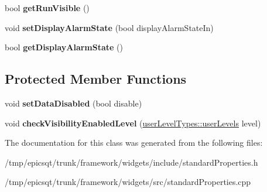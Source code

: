 \begin{DoxyCompactItemize}
\item 
\hypertarget{classstandardProperties_aad59ccae5e05b7807ff46f76323ee4a6}{
bool {\bfseries getRunVisible} ()}
\label{classstandardProperties_aad59ccae5e05b7807ff46f76323ee4a6}

\item 
\hypertarget{classstandardProperties_a3040c5de38de095b6bc3274f148bce8f}{
void {\bfseries setDisplayAlarmState} (bool displayAlarmStateIn)}
\label{classstandardProperties_a3040c5de38de095b6bc3274f148bce8f}

\item 
\hypertarget{classstandardProperties_a4ce4f7715acc47d741d9b2d7e7efb998}{
bool {\bfseries getDisplayAlarmState} ()}
\label{classstandardProperties_a4ce4f7715acc47d741d9b2d7e7efb998}

\end{DoxyCompactItemize}
\subsection*{Protected Member Functions}
\begin{DoxyCompactItemize}
\item 
\hypertarget{classstandardProperties_ae16eaa0aaee03f46e344ff2c3d68806d}{
void {\bfseries setDataDisabled} (bool disable)}
\label{classstandardProperties_ae16eaa0aaee03f46e344ff2c3d68806d}

\item 
\hypertarget{classstandardProperties_abe2492cea2402209ed1d349d7bde9ed5}{
void {\bfseries checkVisibilityEnabledLevel} (\hyperlink{classuserLevelTypes_a033cf2a40f620286b1839dd360c8497b}{userLevelTypes::userLevels} level)}
\label{classstandardProperties_abe2492cea2402209ed1d349d7bde9ed5}

\end{DoxyCompactItemize}


The documentation for this class was generated from the following files:\begin{DoxyCompactItemize}
\item 
/tmp/epicsqt/trunk/framework/widgets/include/standardProperties.h\item 
/tmp/epicsqt/trunk/framework/widgets/src/standardProperties.cpp\end{DoxyCompactItemize}
